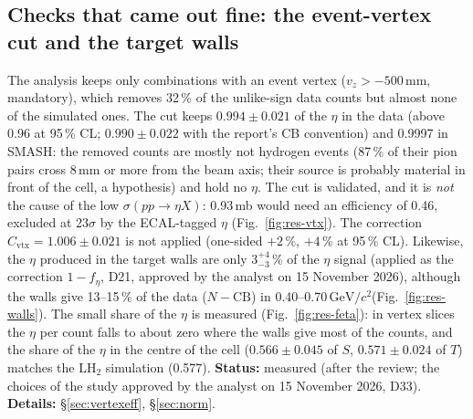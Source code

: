 \documentclass[11pt,a4paper]{article}
\newcommand{\GeVcc}{\ensuremath{\mathrm{GeV}/c^{2}}\xspace}
\newcommand{\vz}{\ensuremath{v_z}\xspace}
\newcommand{\feta}{\ensuremath{f_\eta}\xspace}
\newcommand{\sigeta}{\ensuremath{\sigma(pp\to\eta X)}\xspace}
\begin{document}
\subsection{Checks that came out fine: the event-vertex cut and the target walls}
\label{sec:res-vtx}
The analysis keeps only combinations with an event vertex ($\vz>-500$\,mm, mandatory), which removes 32\,\% of the unlike-sign data counts but
almost none of the simulated ones. The cut keeps $0.994\pm0.021$ of the $\eta$ in the data (above 0.96 at 95\,\% CL; $0.990\pm0.022$ with the report's
CB convention) and 0.9997 in SMASH: the removed counts are mostly not hydrogen events (87\,\% of their pion pairs cross 8\,mm or more from the beam
axis; their source is probably material in front of the cell, a hypothesis) and hold no $\eta$. The cut is validated, and it is \emph{not} the
cause of the low \sigeta: 0.93\,mb would need an efficiency of 0.46, excluded at 23$\sigma$ by the ECAL-tagged $\eta$ (Fig.~\ref{fig:res-vtx}). The correction
$C_{\mathrm{vtx}}=1.006\pm0.021$ is not applied (one-sided $+2$\,\%, $+4$\,\% at 95\,\% CL). Likewise, the $\eta$ produced in the target walls
are only $3^{+4}_{-3}$\,\% of the $\eta$ signal (applied as the correction $1-\feta$, D21, approved by the analyst on 15 November 2026), although the walls give 13--15\,\% of the data
($N-\mathrm{CB}$) in 0.40--0.70\,\GeVcc (Fig.~\ref{fig:res-walls}). The small share of the $\eta$ is measured (Fig.~\ref{fig:res-feta}): in
vertex slices the $\eta$ per count falls to about zero where the walls give most of the counts, and the share of the $\eta$ in the centre of the cell ($0.566\pm0.045$ of $S$, $0.571\pm0.024$ of $T$) matches the LH$_2$ simulation (0.577).
\textbf{Status:} measured (after the review; the choices of the study approved by the analyst on 15 November 2026, D33). \textbf{Details:} \S\ref{sec:vertexeff},
\S\ref{sec:norm}.
\end{document}
